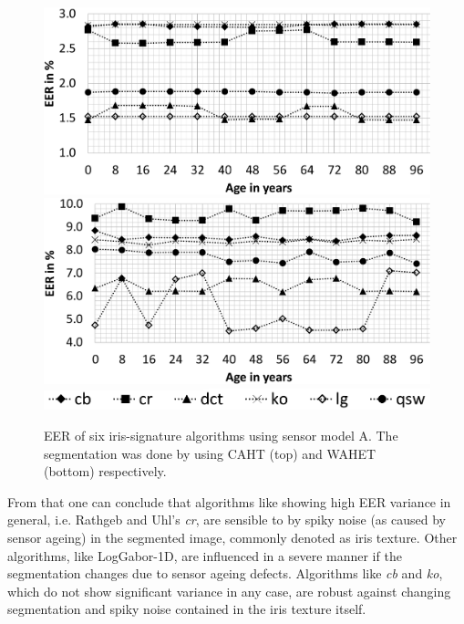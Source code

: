 \documentclass[10pt,twocolumn,letterpaper]{article}
\begin{document}
 
  \begin{figure}
  \centering
  \includegraphics[width=\linewidth]{img/sensor1_caht.png}
  \includegraphics[width=\linewidth]{img/sensor1_wahet.png}
  \includegraphics[width=0.8\linewidth]{img/legend_sensor1.png}
  \caption{EER of six iris-signature algorithms using sensor model A. The segmentation was done by using CAHT (top) and WAHET (bottom) respectively.}
  \label{fig:sensor1}
\end{figure}

From that one can conclude that algorithms like showing high EER variance in general, i.e. Rathgeb and Uhl's \emph{cr}, are sensible to by spiky noise (as caused by sensor ageing) in the segmented image, commonly denoted as iris texture. Other algorithms, like LogGabor-1D, are influenced in a severe manner if the segmentation changes due to sensor ageing defects. Algorithms like \emph{cb} and \emph{ko}, which do not show significant variance in any case, are robust against changing segmentation and spiky noise contained in the iris texture itself.
\end{document}
